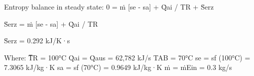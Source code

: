 Entropy balance in steady state:  
0 = ṁ [se - sa] + Q̇ai / TR + Ṡerz  

Ṡerz = ṁ [se - sa] + Q̇ai / TR  

Ṡerz = 0.292 kJ/K·s  

Where:  
T̅R = 100°C  
Q̇ai = Q̇aus = 62,782 kJ/s  
TAB = 70°C  
se = sf (100°C) = 7.3065 kJ/kg·K  
sa = sf (70°C) = 0.9649 kJ/kg·K  
ṁ = ṁEin = 0.3 kg/s